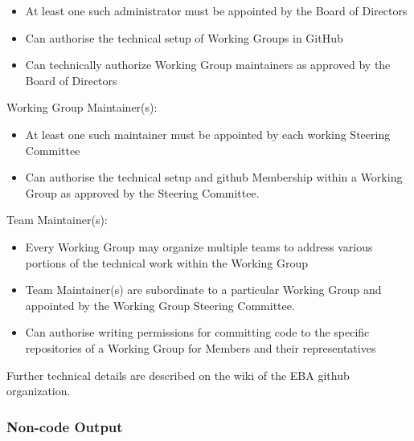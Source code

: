\documentclass{article}
\begin{document}
\begin{itemize}
	\item At least one such administrator must be appointed by the Board of Directors
	\item Can authorise the technical setup of Working Groups in GitHub
	\item Can technically authorize Working Group maintainers as approved by the Board of Directors
\end{itemize}

Working Group Maintainer(s):  \\

\begin{itemize}
	\item At least one such maintainer must be appointed by each working Steering Committee
	\item Can authorise the technical setup and github Membership within a Working Group as approved by the Steering Committee.
\end{itemize}

Team Maintainer(s):  \\

\begin{itemize}
	\item Every Working Group may organize multiple teams to address various portions of the technical work within the Working Group
	\item Team Maintainer(s) are subordinate to a particular Working Group and appointed by the Working Group Steering Committee.
	\item Can authorise writing permissions for committing code to the specific repositories of a Working Group for Members and their representatives
\end{itemize}

Further technical details are described on the wiki of the EBA github organization.

\subsubsection{Non-code Output}
\end{document}
